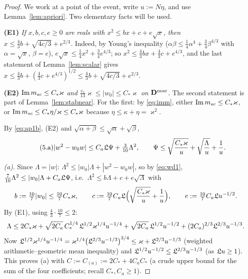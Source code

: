 \begin{proof}
We work at a point of the event, write $u:=N\eta$, and use Lemma~\ref{lem:apriori}. Two elementary facts will be used.

\smallskip\noindent\textbf{(E1)} \emph{If $x,b,c,e\ge0$ are reals with $x^2\le bx+c+e\sqrt x$, then $x\le\frac43b+\sqrt{4c/3}+e^{2/3}$.} Indeed, by Young's inequality ($\alpha\beta\le\frac14\alpha^4+\frac34\beta^{4/3}$ with $\alpha=\sqrt x$, $\beta=e$), $e\sqrt x\le\frac14x^2+\frac34e^{4/3}$; so
$x^2\le\frac43bx+\frac43c+e^{4/3}$, and the last statement of Lemma~\ref{lem:scalar} gives $x\le\frac43b+(\frac43c+e^{4/3})^{1/2}\le\frac43b+\sqrt{4c/3}+e^{2/3}$.

\smallskip\noindent\textbf{(E2)} \emph{$\operatorname{Im}m_{sc}\le C_*\varkappa$ and $\frac{c_*}{13}\varkappa\le|w_0|\le C_*\varkappa$ on $\mathbf{D}^{\rm near}$.} The second statement is part of Lemma~\ref{lem:stabnear}. For the first: by \eqref{eq:imm}, either $\operatorname{Im}m_{sc}\le C_*\varkappa$, or $\operatorname{Im}m_{sc}\le C_*\eta/\varkappa\le C_*\varkappa$ because $\eta\le\kappa+\eta=\varkappa^2$.

\smallskip By \eqref{eq:ap1b}, (E2) and $\sqrt{\alpha+\beta}\le\sqrt\alpha+\sqrt\beta$,
\begin{equation}\tag{5.a}\label{eq:wd1}
 |w^2-w_0w|\le C_a\mathfrak{L}\Psi+\tfrac3{10}\Lambda^2,\qquad\Psi\le\sqrt{\frac{C_*\varkappa}u}+\sqrt{\frac\Lambda u}+\frac1u .
\end{equation}

\emph{(a).} Since $\Lambda=|w|$: $\Lambda^2\le|w_0|\Lambda+|w^2-w_0w|$, so by \eqref{eq:wd1}, $\frac7{10}\Lambda^2\le|w_0|\Lambda+C_a\mathfrak{L}\Psi$, i.e.\ $\Lambda^2\le b\Lambda+c+e\sqrt\Lambda$ with
\[
 b:=\tfrac{10}7|w_0|\le\tfrac{10}7C_*\varkappa,\qquad c:=\tfrac{10}7C_a\mathfrak{L}\Big(\sqrt{\frac{C_*\varkappa}u}+\frac1u\Big),\qquad e:=\tfrac{10}7C_a\mathfrak{L} u^{-1/2}.
\]
By (E1), using $\frac43\cdot\frac{10}7\le2$:
\[
 \Lambda\le2C_*\varkappa+\sqrt{2C_a}\,C_*^{1/4}\,\mathfrak{L}^{1/2}\varkappa^{1/4}u^{-1/4}+\sqrt{2C_a}\,\mathfrak{L}^{1/2}u^{-1/2}+(2C_a)^{2/3}\mathfrak{L}^{2/3}u^{-1/3}.
\]
Now $\mathfrak{L}^{1/2}\varkappa^{1/4}u^{-1/4}=\varkappa^{1/4}\big(\mathfrak{L}^{2/3}u^{-1/3}\big)^{3/4}\le\varkappa+\mathfrak{L}^{2/3}u^{-1/3}$ (weighted arithmetic--geometric mean inequality) and $\mathfrak{L}^{1/2}u^{-1/2}\le\mathfrak{L}^{2/3}u^{-1/3}$ (as $\mathfrak{L} u\ge1$).
This proves (a) with $C:=C_{(a)}:=2C_*+4C_aC_*$ (a crude upper bound for the sum of the four coefficients; recall $C_*,C_a\ge1$).


\end{proof}
